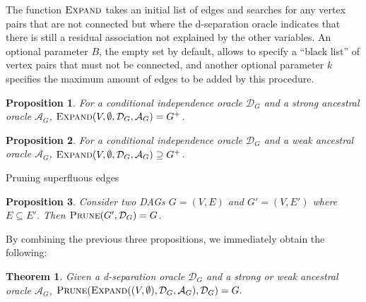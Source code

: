 \documentclass{uai2025} %
\newtheorem{proposition}{Proposition}
\newtheorem{theorem}{Theorem}
\begin{document}
The function $\textsc{Expand}$ takes an initial list of edges and searches for 
any vertex pairs that are not connected but where the d-separation oracle 
indicates  that there is still a residual association not explained by the other variables.
An optional parameter $B$, the empty set by default, allows to specify a ``black list''
of vertex pairs that must not be connected, and another optional parameter $k$
specifies the maximum amount of edges to be added by this procedure.

\begin{proposition}
For a conditional independence oracle
 $\mathcal{D}_G$ and a strong ancestral oracle $\mathcal{A}_G$, 
$\textsc{Expand}(V,\emptyset,\mathcal{D}_G,\mathcal{A}_G)=G^+$.
\end{proposition}

\begin{proposition}
For a conditional independence oracle
 $\mathcal{D}_G$ and a weak ancestral oracle $\mathcal{A}_G$, 
$\textsc{Expand}(V,\emptyset,\mathcal{D}_G,\mathcal{A}_G)\supseteq G^+$.
\end{proposition}


\begin{algorithm}[h]
\DontPrintSemicolon
\SetAlgoLined

\caption{Pruning superfluous edges}
\label{algo:prune}
\end{algorithm}




\begin{proposition}
Consider two DAGs $G=(V,E)$ and $G'=(V,E')$ where $E \subseteq E'$. 
Then $\textsc{Prune}(G',\mathcal{D}_G)=G$.
\label{prop:prune}
\end{proposition}

By combining the previous three propositions, we immediately obtain the following:

\begin{theorem}
Given a d-separation oracle $\mathcal{D}_G$ and a strong or weak 
ancestral oracle $\mathcal{A}_G$, 
$\textsc{Prune}(\textsc{Expand}((V,\emptyset),\mathcal{D}_G,\mathcal{A}_G),\mathcal{D}_G)=G.$
\end{theorem}
\end{document}

